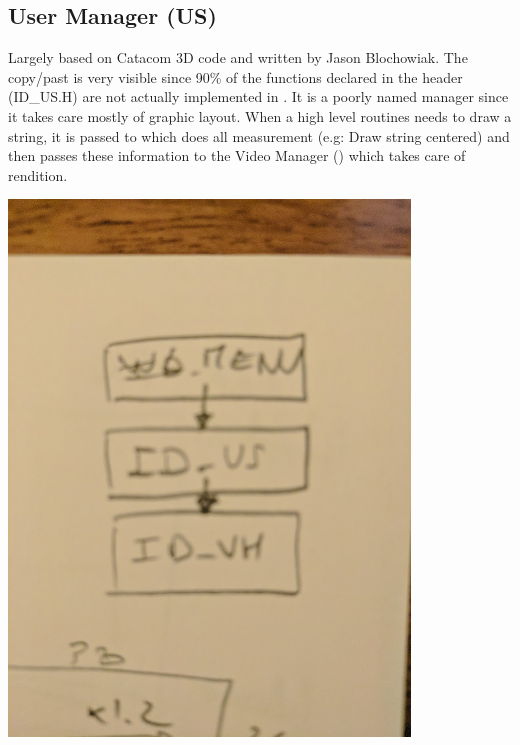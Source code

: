 \documentclass[book.tex]{subfiles}
\begin{document}
\subsection{User Manager (US)}
\begin{minipage}{0.7\textwidth}
Largely based on Catacom 3D code and written by Jason Blochowiak. The copy/past is very visible since 90\% of the functions declared in the header (ID\_US.H) are not actually implemented in . 
It is a poorly named manager since it takes care mostly of graphic layout. When a  high level routines needs to draw a string, it is passed to  which does all measurement (e.g: Draw string centered)
and then passes these information to the Video Manager () which takes care of rendition.
\end{minipage}
\begin{minipage}{0.3\textwidth}
\begin{flushright}
\includegraphics[width=0.8\textwidth]{imgs/US_explained.png}
\end{flushright}
\end{minipage}
\noindent
\\
\end{document}
